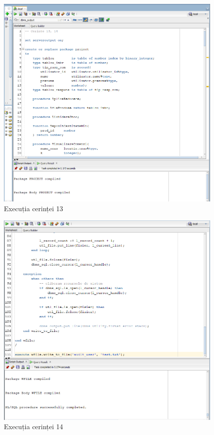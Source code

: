 \documentclass[12pt]{article}
\begin{document}
\begin{figure}[htp]
\centering
\includegraphics[width=1\linewidth]{Cerinta13.png}
\caption{Execuția cerinței 13}
\end{figure}

\begin{figure}[htp]
\centering
\includegraphics[width=1\linewidth]{Cerinta14.png}
\caption{Execuția cerinței 14}
\end{figure}



\end{document}
